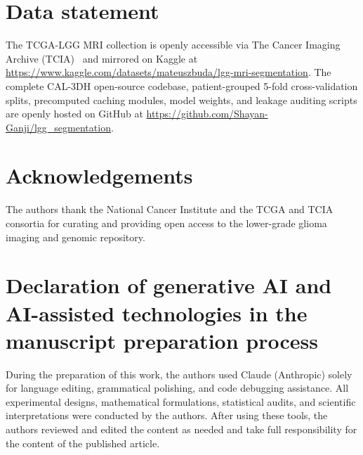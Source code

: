\documentclass[preprint,12pt,authoryear]{elsarticle}
\begin{document}
\section*{Data statement}
The TCGA-LGG MRI collection is openly accessible via The Cancer Imaging Archive (TCIA)~\citep{clark2013cancer,tcgalgg2019data} and mirrored on Kaggle at \url{https://www.kaggle.com/datasets/mateuszbuda/lgg-mri-segmentation}. The complete CAL-3DH open-source codebase, patient-grouped 5-fold cross-validation splits, precomputed caching modules, model weights, and leakage auditing scripts are openly hosted on GitHub at \url{https://github.com/Shayan-Ganji/lgg_segmentation}.

\section*{Acknowledgements}
The authors thank the National Cancer Institute and the TCGA and TCIA consortia for curating and providing open access to the lower-grade glioma imaging and genomic repository.

\section*{Declaration of generative AI and AI-assisted technologies in the manuscript preparation process}
During the preparation of this work, the authors used Claude (Anthropic) solely for language editing, grammatical polishing, and code debugging assistance. All experimental designs, mathematical formulations, statistical audits, and scientific interpretations were conducted by the authors. After using these tools, the authors reviewed and edited the content as needed and take full responsibility for the content of the published article.



\end{document}
